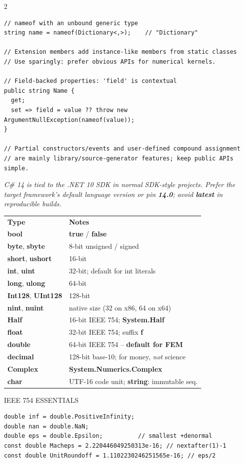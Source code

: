 \documentclass[9pt,a4paper]{extarticle}
\newenvironment{card}[3][acBlue]{%
  \begin{tcolorbox}[
    enhanced, colback=#2, colframe=bdCard,
    coltitle=black, colbacktitle=#2!70!bgHdr,
    fonttitle=\bfseries\fontsize{6.16pt}{7.48pt}\selectfont\MakeUppercase,
    title={#3},
    left=3pt, right=2pt, top=1.4pt, bottom=1.8pt,
    toptitle=1pt, bottomtitle=1pt,
    boxrule=0.4pt,
    borderline west={3pt}{0pt}{#1},
    arc=2pt, before skip=0pt, after skip=1.6mm,
    breakable, toprule at break=0pt, bottomrule at break=0pt,
  ]}{\end{tcolorbox}}
\newcommand{\sub}[1]{%
  \par\vspace{1.5pt}%
  {\fontsize{5.7pt}{7pt}\selectfont\color{gray}\MakeUppercase{#1}}\par
  \vspace{0.5pt}}
\newcommand{\code}[1]{{\ttfamily\bfseries #1}}
\newcommand{\note}[1]{\par\noindent
  \begin{minipage}{\linewidth}%
  {\fontsize{5.6pt}{6.8pt}\selectfont\itshape #1}%
  \end{minipage}\par}
\begin{document}
\begin{multicols}{2}
\begin{card}[acTeal]{bgTeal}{C\# 14 Essentials}
\begin{lstlisting}[style=cs]
// nameof with an unbound generic type
string name = nameof(Dictionary<,>);    // "Dictionary"

// Extension members add instance-like members from static classes
// Use sparingly: prefer obvious APIs for numerical kernels.

// Field-backed properties: 'field' is contextual
public string Name {
  get;
  set => field = value ?? throw new ArgumentNullException(nameof(value));
}

// Partial constructors/events and user-defined compound assignment
// are mainly library/source-generator features; keep public APIs simple.
\end{lstlisting}
\note{C\# 14 is tied to the .NET 10 SDK in normal SDK-style projects.
Prefer the target framework's default language version or pin
\code{14.0}; avoid \code{latest} in reproducible builds.}
\end{card}

\begin{card}[acNavy]{bgNavy}{Built-in Types Reference}
\fontsize{6.0pt}{7.4pt}\selectfont
\begin{tabular}{@{}p{16mm}p{32mm}@{}}
\rowcolor{bgHdr}\textbf{Type} & \textbf{Notes}\\
\code{bool}     & \code{true} / \code{false}\\
\code{byte}, \code{sbyte} & 8-bit unsigned / signed\\
\code{short}, \code{ushort} & 16-bit\\
\code{int}, \code{uint} & 32-bit; default for int literals\\
\code{long}, \code{ulong} & 64-bit\\
\code{Int128}, \code{UInt128} & 128-bit\\
\code{nint}, \code{nuint} & native size (32 on x86, 64 on x64)\\
\code{Half}     & 16-bit IEEE 754; \code{System.Half}\\
\code{float}    & 32-bit IEEE 754; suffix \code{f}\\
\code{double}   & 64-bit IEEE 754 -- \textbf{default for FEM}\\
\code{decimal}  & 128-bit base-10; for money, \emph{not} science\\
\code{Complex}  & \code{System.Numerics.Complex}\\
\code{char}     & UTF-16 code unit; \code{string}: immutable seq.\\
\end{tabular}
\sub{IEEE 754 essentials}
\begin{lstlisting}[style=cs]
double inf = double.PositiveInfinity;
double nan = double.NaN;
double eps = double.Epsilon;          // smallest +denormal
const double Macheps = 2.220446049250313e-16; // nextafter(1)-1
const double UnitRoundoff = 1.1102230246251565e-16; // eps/2


\end{lstlisting}
\end{card}
\end{multicols}
\end{document}
